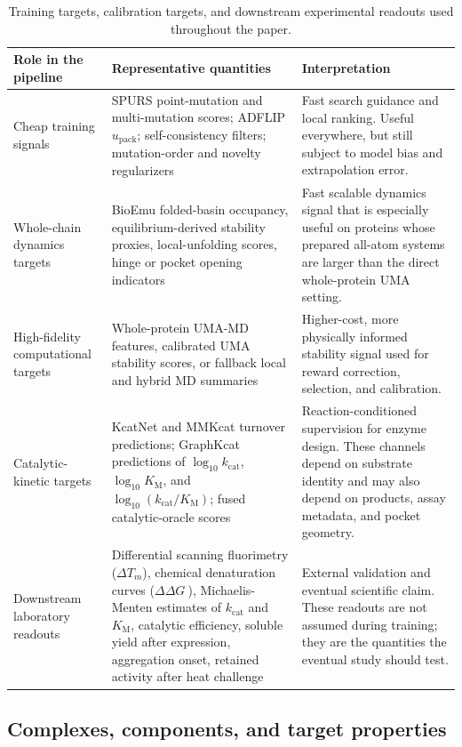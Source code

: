 \documentclass[11pt]{article}
\newcommand{\packunc}{\ensuremath{u_{\mathrm{pack}}}}
\newcommand{\ddG}{\ensuremath{\Delta\Delta G \ }}
\newcommand{\kcat}{\ensuremath{k_{\mathrm{cat}}}}
\newcommand{\Km}{\ensuremath{K_{\mathrm M}}}
\newcommand{\logkcat}{\ensuremath{\log_{10} k_{\mathrm{cat}}}}
\newcommand{\logKm}{\ensuremath{\log_{10} K_{\mathrm M}}}
\newcommand{\logeff}{\ensuremath{\log_{10}(k_{\mathrm{cat}}/K_{\mathrm M})}}
\begin{document}
	\begin{table}[H]
		\centering
		\caption{Training targets, calibration targets, and downstream experimental readouts used throughout the paper.}
		\label{tab:targetsreadouts}
		\begin{tabularx}{\textwidth}{>{\raggedright\arraybackslash}p{} >{\raggedright\arraybackslash}p{} >{\raggedright\arraybackslash}X}
			\toprule
			Role in the pipeline & Representative quantities & Interpretation \\
			\midrule
			Cheap training signals & SPURS point-mutation and multi-mutation scores; ADFLIP \packunc; self-consistency filters; mutation-order and novelty regularizers & Fast search guidance and local ranking. Useful everywhere, but still subject to model bias and extrapolation error. \\
			Whole-chain dynamics targets & BioEmu folded-basin occupancy, equilibrium-derived stability proxies, local-unfolding scores, hinge or pocket opening indicators & Fast scalable dynamics signal that is especially useful on proteins whose prepared all-atom systems are larger than the direct whole-protein UMA setting. \\
			High-fidelity computational targets & Whole-protein UMA-MD features, calibrated UMA stability scores, or fallback local and hybrid MD summaries & Higher-cost, more physically informed stability signal used for reward correction, selection, and calibration. \\
			Catalytic-kinetic targets & KcatNet and MMKcat turnover predictions; GraphKcat predictions of $\logkcat$, $\logKm$, and $\logeff$; fused catalytic-oracle scores & Reaction-conditioned supervision for enzyme design. These channels depend on substrate identity and may also depend on products, assay metadata, and pocket geometry. \\
			Downstream laboratory readouts & Differential scanning fluorimetry ($\Delta T_m$), chemical denaturation curves (\ddG), Michaelis-Menten estimates of $\kcat$ and $\Km$, catalytic efficiency, soluble yield after expression, aggregation onset, retained activity after heat challenge & External validation and eventual scientific claim. These readouts are not assumed during training; they are the quantities the eventual study should test. \\
			\bottomrule
		\end{tabularx}
	\end{table}
	
	\subsection{Complexes, components, and target properties}
	
\end{document}
